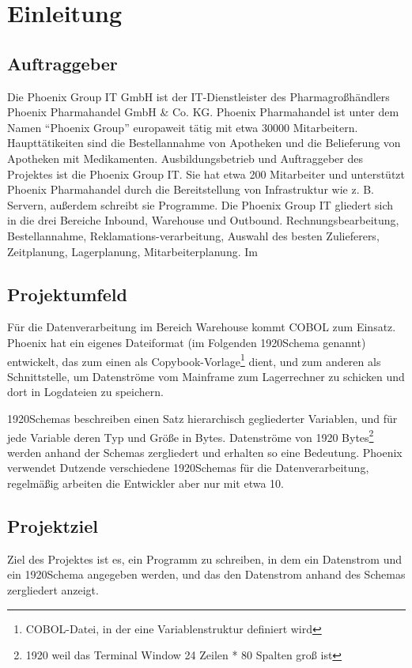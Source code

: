 \section{Einleitung}
\label{sec:Einleitung}


\subsection{Auftraggeber}
\label{sec:Auftraggeber}
Die Phoenix Group IT GmbH ist der IT-Dienstleister des Pharmagroßhändlers Phoenix Pharmahandel
GmbH \& Co. KG. Phoenix Pharmahandel ist unter dem Namen ``Phoenix Group'' europaweit tätig mit
etwa 30000 Mitarbeitern. Haupttätikeiten sind die Bestellannahme von Apotheken und die Belieferung
von Apotheken mit Medikamenten. Ausbildungsbetrieb und Auftraggeber des Projektes ist die Phoenix Group IT. Sie hat etwa 200 Mitarbeiter und unterstützt Phoenix Pharmahandel durch die Bereitstellung von Infrastruktur wie z. B. Servern, außerdem schreibt sie Programme. Die Phoenix Group IT gliedert sich in die drei Bereiche Inbound, Warehouse und Outbound. Rechnungsbearbeitung, Bestellannahme, Reklamations-verarbeitung, Auswahl des besten Zulieferers, Zeitplanung, Lagerplanung, Mitarbeiterplanung. Im 

\subsection{Projektumfeld} 
\label{sec:Projektumfeld}
Für die Datenverarbeitung im Bereich Warehouse kommt COBOL zum Einsatz. Phoenix hat  ein eigenes Dateiformat (im Folgenden 1920Schema genannt) entwickelt, das zum einen als Copybook-Vorlage\footnote{COBOL-Datei, in der eine Variablenstruktur definiert wird} dient, und zum anderen als Schnittstelle, um Datenströme vom Mainframe zum Lagerrechner zu schicken und dort in Logdateien zu speichern.

1920Schemas beschreiben einen Satz hierarchisch gegliederter Variablen, und für jede Variable deren Typ und Größe in Bytes. Datenströme von 1920 Bytes\footnote{1920 weil das Terminal Window 24 Zeilen * 80 Spalten groß ist} werden anhand der Schemas zergliedert und erhalten so eine Bedeutung. Phoenix verwendet Dutzende verschiedene 1920Schemas für die Datenverarbeitung, regelmäßig arbeiten die Entwickler aber nur mit etwa 10.

\subsection{Projektziel} 
\label{sec:Projektziel}
Ziel des Projektes ist es, ein Programm zu schreiben, in dem ein Datenstrom und ein 1920Schema angegeben werden, und das den Datenstrom anhand des Schemas zergliedert anzeigt.


